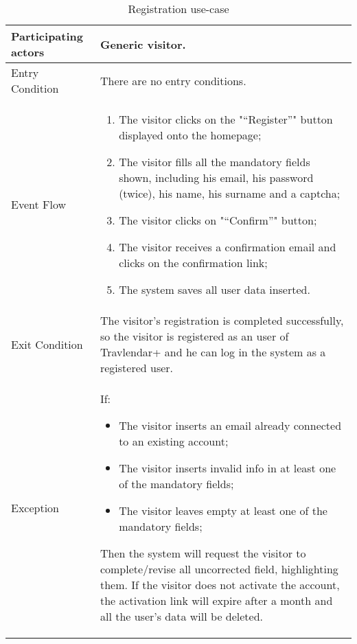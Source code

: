 \begin{table}[H]
	\begin{center}
		\begin{tabular}{ | p{} | p{} | }
		\hline
		Participating actors & Generic visitor.\\
		\hline
		Entry Condition & There are no entry conditions.\\
		\hline
		Event Flow & 
			\begin{enumerate}
				\item The visitor clicks on the "“Register”" button displayed onto the homepage;
				\item The visitor fills all the mandatory fields shown, including his email, his password (twice), his name, his surname and a captcha;
				\item The visitor clicks on "“Confirm”" button;
				\item The visitor receives a confirmation email and clicks on the confirmation link;
				\item The system saves all user data inserted.
			\end{enumerate} \\
		\hline
		Exit Condition & The visitor's registration is completed successfully, so the visitor is registered as an user of Travlendar+ and he can log in the system as a registered user. \\
		\hline
		Exception & If:
				\begin{itemize}
   					\item The visitor inserts an email already connected to an existing account;
   					\item The visitor inserts invalid info in at least one of the mandatory fields;
   					\item The visitor leaves empty at least one of the mandatory fields;
   				\end{itemize}
   		Then the system will request the visitor to complete/revise all uncorrected field, highlighting them.
If the visitor does not activate the account, the activation link will expire after a month and all the user's data will be deleted.\\ 
		\hline
		\end{tabular}
	\end{center}
	\caption{Registration use-case}
\end{table}